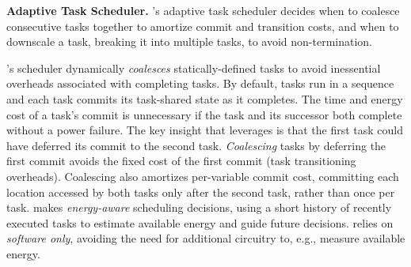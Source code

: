 \textbf{\sys Adaptive Task Scheduler.} 
\sys's adaptive task scheduler decides when to coalesce consecutive tasks
together to amortize commit and transition costs, and when to downscale a task,
breaking it into multiple tasks, to avoid non-termination.

\sys's scheduler dynamically {\em coalesces} statically\hyp{}defined tasks to
avoid inessential overheads associated with completing tasks. By default, tasks
run in a sequence and each task commits its task-shared state as it completes.
The time and energy cost of a task's commit is unnecessary if the task and its
successor both complete without a power failure. The key insight that \sys
leverages is that the first task could have deferred its commit to the second
task. {\em Coalescing} tasks by deferring the first commit avoids the fixed
cost of the first commit (task transitioning overheads). Coalescing also
amortizes per-variable commit cost, committing each location accessed by both
tasks only after the second task, rather than once per task.  \sys makes
\emph{energy-aware} scheduling decisions, using a short history of recently
executed tasks to estimate available energy and guide future decisions. \sys
relies on {\em software only}, avoiding the need for additional circuitry to,
e.g., measure available energy.


